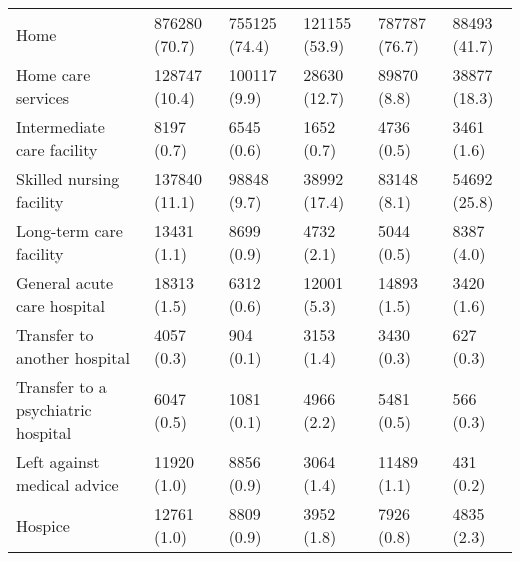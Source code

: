 \begin{adjustbox}{width={\textwidth},totalheight={\textheight},keepaspectratio,frame}
{\begin{tabular}{L{20em}C{10em}C{10em}C{10em}C{10em}C{10em}}
\hspace{3mm}                               Home &      876280 (70.7) &                 755125 (74.4) &             121155 (53.9) &                  787787 (76.7) &              88493 (41.7) \\
\hspace{3mm}                 Home care services &      128747 (10.4) &                  100117 (9.9) &              28630 (12.7) &                    89870 (8.8) &              38877 (18.3) \\
\hspace{3mm}         Intermediate care facility &         8197 (0.7) &                    6545 (0.6) &                1652 (0.7) &                     4736 (0.5) &                3461 (1.6) \\
\hspace{3mm}           Skilled nursing facility &      137840 (11.1) &                   98848 (9.7) &              38992 (17.4) &                    83148 (8.1) &              54692 (25.8) \\
\hspace{3mm}            Long-term care facility &        13431 (1.1) &                    8699 (0.9) &                4732 (2.1) &                     5044 (0.5) &                8387 (4.0) \\
\hspace{3mm}        General acute care hospital &        18313 (1.5) &                    6312 (0.6) &               12001 (5.3) &                    14893 (1.5) &                3420 (1.6) \\
\hspace{3mm}       Transfer to another hospital &         4057 (0.3) &                     904 (0.1) &                3153 (1.4) &                     3430 (0.3) &                 627 (0.3) \\
\hspace{3mm} Transfer to a psychiatric hospital &         6047 (0.5) &                    1081 (0.1) &                4966 (2.2) &                     5481 (0.5) &                 566 (0.3) \\
\hspace{3mm}        Left against medical advice &        11920 (1.0) &                    8856 (0.9) &                3064 (1.4) &                    11489 (1.1) &                 431 (0.2) \\
\hspace{3mm}                            Hospice &        12761 (1.0) &                    8809 (0.9) &                3952 (1.8) &                     7926 (0.8) &                4835 (2.3) \\

\end{tabular}}
\end{adjustbox}
